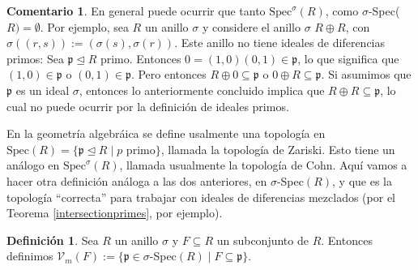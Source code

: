 \documentclass[12pt,a4paper,BCOR15mm,twoside,DIV12]{article}
\def\Spec{\text{Spec}}
\def\Vm{\mathcal{V}_m}
\def\p{\mathfrak{p}}
\def\s{\sigma}
\theoremstyle{definition}
\newtheorem{rem}[Satz]{Comentario}
\newtheorem{defn}[Satz]{Definición}
\begin{document}
\begin{rem}
En general puede ocurrir que tanto $\Spec^\s(R)$, como $\s$-Spec($R)= \emptyset$. Por ejemplo, sea $R$ un anillo $\s$ y considere el anillo $\s$ $R \oplus R$, con $\s( (r,s)):= (\s(s),\s(r))$. Este anillo no tiene ideales de diferencias primos:
Sea $\p \unlhd R$ primo. Entonces $0 = (1,0)(0,1) \in \p$, lo que significa que $(1,0) \in \p$ o $(0,1) \in \p$. Pero entonces $R \oplus 0 \subseteq \p$ o $0 \oplus R \subseteq \p$. Si asumimos que $\p$ es un ideal $\s$, entonces
lo anteriormente concluido implica que $R \oplus R \subseteq \p$, lo cual no puede ocurrir por la definición de ideales primos.
\end{rem}

En la geometría algebráica se define usalmente una topología en $\Spec(R) = \{ \p \unlhd R \mid p \text { primo} \}$, llamada la topología de Zariski. Esto tiene un análogo en $\Spec^\s(R)$, llamada usualmente la topología de Cohn.
Aquí vamos a hacer otra definición análoga a las dos anteriores, en $\s$-Spec$(R)$, y que es la topología ``correcta'' para trabajar con ideales de diferencias mezclados (por el Teorema \ref{intersectionprimes}, por ejemplo).

\begin{defn}
Sea $R$ un anillo $\s$ y $F \subseteq R$ un subconjunto de $R$. Entonces definimos $\Vm (F):= \{ \p \in \s$-Spec$(R) \mid F \subseteq \p \}$. 
\end{defn}
\end{document}
